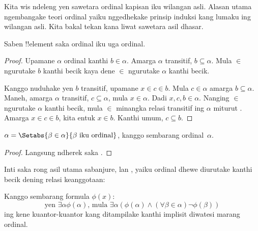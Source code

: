 \documentclass[../../../include/open-logic-section]{subfiles}
\begin{document}

Kita wis ndeleng yen sawetara ordinal kapisan iku
wilangan asli. Alasan utama ngembangake teori ordinal
yaiku nggedhekake prinsip induksi kang lumaku ing
wilangan asli. Kita bakal tekan kana liwat sawetara
asil dhasar.

\begin{lem}
Saben !!{element} saka ordinal iku uga ordinal.
\end{lem}

\begin{proof}
Upamane $\alpha$ ordinal kanthi $b \in \alpha$.
Amarga $\alpha$ transitif, $b \subseteq \alpha$.
Mula $\in$ ngurutake $b$ kanthi becik kaya dene
$\in$ ngurutake $\alpha$ kanthi becik.

Kanggo nuduhake yen $b$ transitif, upamane
$x \in c \in b$. Mula $c \in \alpha$ amarga
$b \subseteq \alpha$. Maneh, amarga $\alpha$
transitif, $c \subseteq \alpha$, mula $x \in \alpha$.
Dadi $x, c, b \in \alpha$. Nanging $\in$
ngurutake $\alpha$ kanthi becik, mula $\in$
minangka relasi transitif ing $\alpha$ miturut
. Amarga
$x \in c \in b$, kita entuk $x \in b$. Kanthi
umum, $c \subseteq b$.
\end{proof}

\begin{cor}
$\alpha = \Setabs{\beta \in \alpha}{\beta \text{ iku ordinal}}$,
kanggo sembarang ordinal~$\alpha$.
\end{cor}

\begin{proof}
Langsung ndherek saka .
\end{proof}

Inti saka rong asil utama sabanjure,
 lan ,
yaiku ordinal dhewe diurutake kanthi becik dening
relasi keanggotaan:

\begin{thm}
Kanggo sembarang formula $\phi(x)$:
\[
	\text{yen }\exists \alpha \phi(\alpha)\text{, mula }\exists \alpha(\phi(\alpha)
	\land  (\forall \beta \in \alpha) \lnot \phi(\beta))
\]
ing kene kuantor-kuantor kang ditampilake kanthi
implisit diwatesi marang ordinal.
\end{thm}
\end{document}

